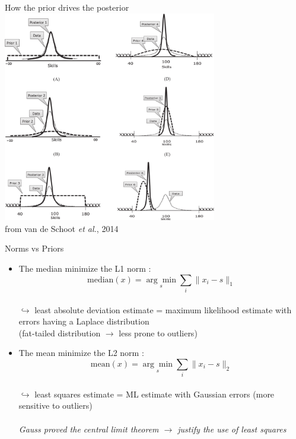 \documentclass[10pt,xcolor=x11names,compress, show notes]{beamer}%
\begin{document}
\begin{frame}{How the prior drives the posterior}
	\centering
	\includegraphics[width=0.7\textwidth]{priors.png}\\
	\scriptsize from van de Schoot \textit{et al.}, 2014
\end{frame}

\begin{frame}{Norms vs Priors}
\begin{itemize}
        \item The median minimize the L1 norm : \\
        $$\text{median}(x) =\underset{s}{\arg\min} \sum_i \|x_i - s\|_1$$\\
        
        $\hookrightarrow$ least absolute deviation estimate = maximum likelihood estimate with errors having a Laplace distribution\\
        (fat-tailed distribution $\rightarrow$ less prone to outliers)
        
        \vfill
        \pause
        \item The mean minimize the L2 norm : \\
        $$\text{mean}(x) =\underset{s}{\arg\min} \sum_i \|x_i - s\|_2$$\\
       $\hookrightarrow$ least squares estimate = ML estimate with Gaussian errors
        (more sensitive to outliers)\\~\\\pause
        \textit{Gauss proved the central limit theorem $\rightarrow$ justify the use of least squares}
        
\end{itemize}
\end{frame}
\end{document}
